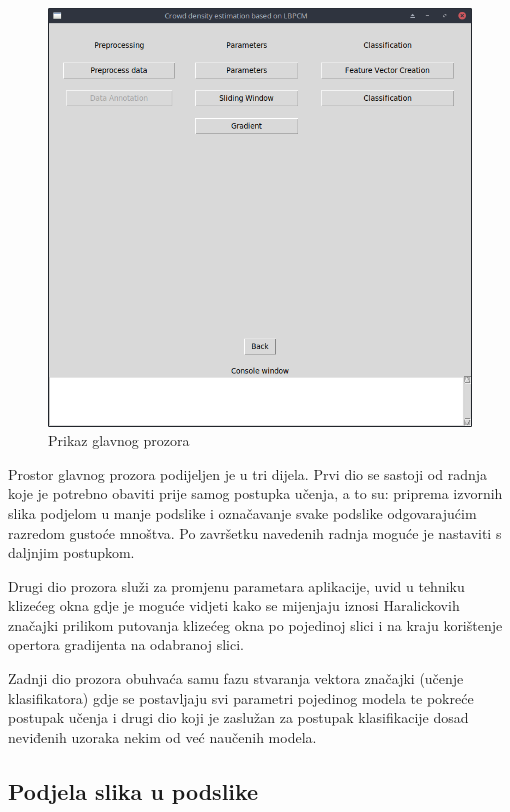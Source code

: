 \documentclass[times, utf8, zavrsni, numeric]{fer}
\begin{document}
\begin{figure}[ht]
\centering
\includegraphics[scale=0.4]{img/mainscreen.png}
\caption{Prikaz glavnog prozora}
\end{figure}

Prostor glavnog prozora podijeljen je u tri dijela. Prvi dio se sastoji
od radnja koje je potrebno obaviti prije samog postupka učenja, a to su:
priprema izvornih slika podjelom u manje podslike i označavanje svake 
podslike odgovarajućim razredom gustoće mnoštva. Po završetku navedenih radnja
moguće je nastaviti s daljnjim postupkom.

\bigbreak

Drugi dio prozora služi za promjenu parametara aplikacije, uvid u tehniku 
klizećeg okna gdje je moguće vidjeti kako se mijenjaju iznosi Haralickovih značajki
prilikom putovanja klizećeg okna po pojedinoj slici i na kraju korištenje
opertora gradijenta na odabranoj slici.

\newpage

Zadnji dio prozora obuhvaća samu fazu stvaranja vektora značajki (učenje
klasifikatora) gdje se postavljaju svi parametri pojedinog modela te pokreće
postupak učenja i drugi dio koji je zaslužan za postupak klasifikacije
dosad neviđenih uzoraka nekim od već naučenih modela.


\subsection{Podjela slika u podslike}
\end{document}

